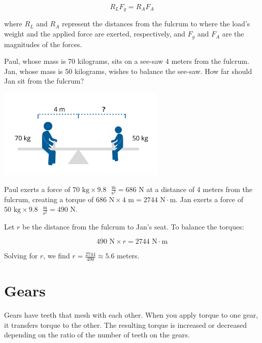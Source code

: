 \[
R_L F_g = R_A F_A
\]

where \( R_L \) and \( R_A \) represent the distances from the fulcrum to where 
the load’s weight and the applied force are exerted, respectively, and \( F_g \) 
and \( F_A \) are the magnitudes of the forces.


\begin{Exercise}[title={Lever}, label=lever]
Paul, whose mass is 70 kilograms, sits on a see-saw 4 meters from the fulcrum. 
Jan, whose mass is 50 kilograms, wishes to balance the see-saw. How far should 
Jan sit from the fulcrum?

\begin{center}
\includegraphics[width=0.6\textwidth]{seesaw.png}
\end{center}

\end{Exercise}
\begin{Answer}[ref=lever]
Paul exerts a force of \( 70 \text{ kg} \times 9.8 \text{ } \frac{\text{m}}{
\text{s}^2} = 686 \text{ N}\) at a distance of 4 meters from the fulcrum, 
creating a torque of \( 686 \text{ N}\times 4 \text{ m} = 2744 \text{ N} \cdot 
\text{m} \). Jan exerts a force of \( 50 \text{ kg} \times 9.8 \text{ } \frac{
\text{m}}{\text{s}^2}= 490 \text{ N}\).

Let \( r \) be the distance from the fulcrum to Jan's seat. To balance the torques:

\[
490 \text{ N}\times r = 2744 \text{ N} \cdot \text{m}
\]

Solving for \( r \), we find \( r = \frac{2744}{490} \approx 5.6 \) meters.
\end{Answer}

\section{Gears}

Gears have teeth that mesh with each other. When you apply torque to one gear, 
it transfers torque to the other. The resulting torque is increased or decreased 
depending on the ratio of the number of teeth on the gears. 

